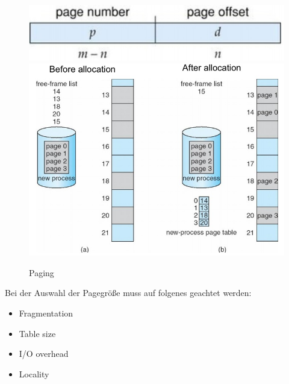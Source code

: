 \documentclass[a4paper]{scrreprt}
\begin{document}
\begin{figure}[ht]
\centering
\includegraphics[scale=0.40]{numberoffset.png}
\includegraphics[scale=0.50]{paging1.png}
\caption{Paging}
\end{figure}


Bei der Auswahl der Pagegröße muss auf folgenes geachtet werden:
\begin{itemize}
\item Fragmentation
\item Table size
\item I/O overhead
\item Locality
\end{itemize}
\end{document}
